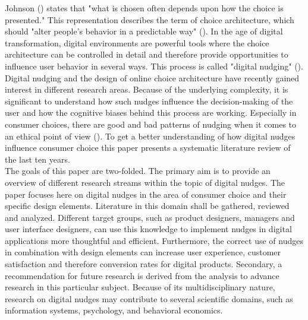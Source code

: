 Johnson (\citeyear[p.488]{johnson_beyond_2012}) states that "what is chosen often depends upon how the choice is presented." This representation describes the term of choice architecture, which should "alter people's behavior in a predictable way" (\cite[p.6]{thaler_nudge:_2009}). In the age of digital transformation, digital environments are powerful tools where the choice architecture can be controlled in detail and therefore provide opportunities to influence user behavior in several ways. This process is called "digital nudging" (\cite{weinmann_digital_2016}).
Digital nudging and the design of online choice architecture have recently gained interest in different research areas. Because of the underlying complexity, it is significant to understand how such nudges influence the decision-making of the user and how the cognitive biases behind this process are working. Especially in consumer choices, there are good and bad patterns of nudging when it comes to an ethical point of view (\cite{sunstein_nudging_2015}). To get a better understanding of how digital nudges influence consumer choice this paper presents a systematic literature review of the last ten years. 
\\

The goals of this paper are two-folded. The primary aim is to provide an overview of different research streams within the topic of digital nudges. The paper focuses here on digital nudges in the area of consumer choice and their specific design elements. Literature in this domain shall be gathered, reviewed and analyzed. Different target groups, such as product designers, managers and user interface designers, can use this knowledge to implement nudges in digital applications more thoughtful and efficient. Furthermore, the correct use of nudges in combination with design elements can increase user experience, customer satisfaction and therefore conversion rates for digital products.
Secondary, a recommendation for future research is derived from the analysis to advance research in this particular subject. Because of its multidisciplinary nature, research on digital nudges may contribute to several scientific domains, such as information systems, psychology, and behavioral economics.
